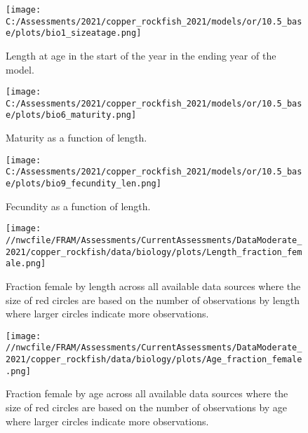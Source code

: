 \documentclass[11pt,
  english,
  a4paper,
]{article}
\begin{document}
\begin{figure}
\centering
\texttt{[image: C:/Assessments/2021/copper\_rockfish\_2021/models/or/10.5\_base/plots/bio1\_sizeatage.png]}
\caption{Length at age in the start of the year in the ending year of the model.\label{fig:len-age-ss}}
\end{figure}

\tagmcend\tagstructend

\clearpage


\begin{figure}
\centering
\texttt{[image: C:/Assessments/2021/copper\_rockfish\_2021/models/or/10.5\_base/plots/bio6\_maturity.png]}
\caption{Maturity as a function of length.\label{fig:maturity}}
\end{figure}

\tagmcend\tagstructend

\clearpage


\begin{figure}
\centering
\texttt{[image: C:/Assessments/2021/copper\_rockfish\_2021/models/or/10.5\_base/plots/bio9\_fecundity\_len.png]}
\caption{Fecundity as a function of length.\label{fig:fecundity}}
\end{figure}

\tagmcend\tagstructend

\clearpage


\begin{figure}
\centering
\texttt{[image: //nwcfile/FRAM/Assessments/CurrentAssessments/DataModerate\_2021/copper\_rockfish/data/biology/plots/Length\_fraction\_female.png]}
\caption{Fraction female by length across all available data sources where the size of red circles are based on the number of observations by length where larger circles indicate more observations.\label{fig:len-sex-ratio}}
\end{figure}

\tagmcend\tagstructend


\begin{figure}
\centering
\texttt{[image: //nwcfile/FRAM/Assessments/CurrentAssessments/DataModerate\_2021/copper\_rockfish/data/biology/plots/Age\_fraction\_female.png]}
\caption{Fraction female by age across all available data sources where the size of red circles are based on the number of observations by age where larger circles indicate more observations.\label{fig:age-sex-ratio}}
\end{figure}
\end{document}
